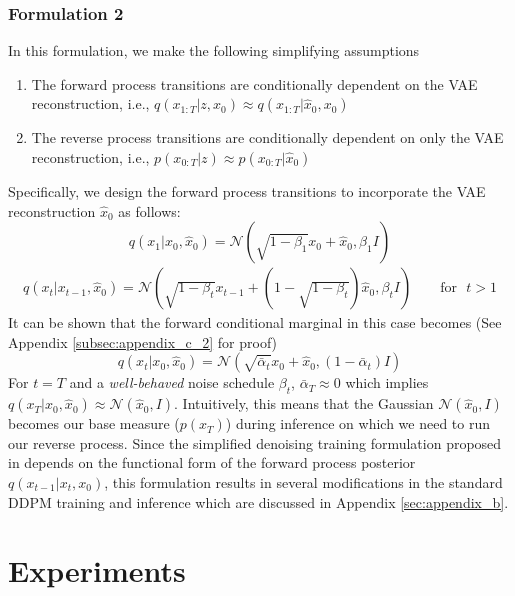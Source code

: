 \documentclass[10pt]{article} \usepackage[accepted]{tmlr}
\begin{document}
\subsubsection{Formulation 2}
\label{subsec:form2}
In this formulation, we make the following simplifying assumptions
\begin{enumerate}
    \item The forward process transitions are conditionally dependent on the VAE reconstruction, i.e., $q(x_{1:T}|z, x_0) \approx q(x_{1:T}|\hat{x}_0, x_0)$
    \item The reverse process transitions are conditionally dependent on only the VAE reconstruction, i.e., $p(x_{0:T}|z) \approx p(x_{0:T}|\hat{x}_0)$
\end{enumerate}
Specifically, we design the forward process transitions to incorporate the VAE reconstruction $\hat{x}_0$ as follows:
\begin{equation}
    q(x_1|x_0, \hat{x}_0) = \mathcal{N}(\sqrt{1 - \beta_1}x_0 + \hat{x}_0, \beta_1I)
\end{equation}
\begin{equation*}
\begin{split}
    q(x_t|x_{t-1}, \hat{x}_0) = \mathcal{N}(\sqrt{1 - \beta_t} x_{t-1} + (1 - \sqrt{1 - \beta_t})\hat{x}_0, \beta_t I) \quad\quad\text{for} \:\:\: t > 1
\end{split}
\end{equation*}
It can be shown that the forward conditional marginal in this case becomes (See Appendix \ref{subsec:appendix_c_2} for proof)
\begin{equation}
    q(x_t|x_0, \hat{x}_0) = \mathcal{N}(\sqrt{\bar{\alpha}_t} x_0 + \hat{x}_0, (1-\bar{\alpha}_t)I)
\end{equation}
For $t=T$ and a \textit{well-behaved} noise schedule $\beta_t$, $\bar{\alpha}_T \approx 0$ which implies $q(x_T|x_0, \hat{x}_0) \approx \mathcal{N}(\hat{x}_0, I)$. Intuitively, this means that the Gaussian $\mathcal{N}(\hat{x}_0, I)$ becomes our base measure ($p(x_T)$) during inference on which we need to run our reverse process. Since the simplified denoising training formulation proposed in \citep{ho2020denoising} depends on the functional form of the forward process posterior $q(x_{t-1}|x_t, x_0)$, this formulation results in several modifications in the standard DDPM training and inference which are discussed in Appendix \ref{sec:appendix_b}.



\section{Experiments}
\label{sec:experiments}
\end{document}
